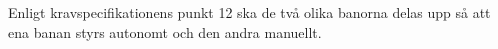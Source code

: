 Enligt kravspecifikationens punkt 12 ska de två olika banorna delas upp så att
ena banan styrs autonomt och den andra manuellt.  


